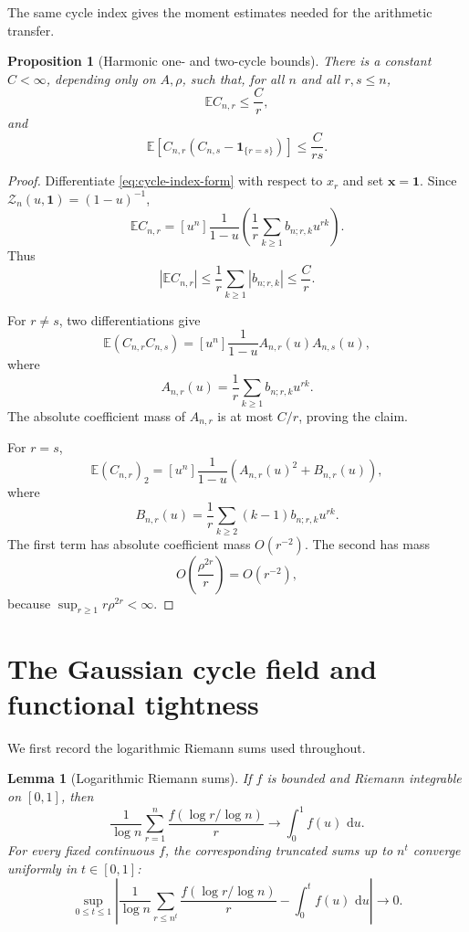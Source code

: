 \documentclass[11pt]{article}
\newtheorem{proposition}[theorem]{Proposition}
\newtheorem{lemma}[theorem]{Lemma}
\theoremstyle{definition}
\theoremstyle{remark}
\newcommand{\Ee}{\mathbb E}
\newcommand{\one}{\mathbf 1}
\newcommand{\dd}{\,\mathrm d}
\newcommand{\cZ}{\mathcal Z}
\begin{document}
The same cycle index gives the moment estimates needed for the arithmetic
transfer.

\begin{proposition}[Harmonic one- and two-cycle bounds]
\label{prop:harmonic-moments}
There is a constant $C<\infty$, depending only on $A,\rho$, such that,
for all $n$ and all $r,s\le n$,
\[
 \Ee C_{n,r}\le\frac{C}{r},
\]
and
\[
 \Ee\!\left[
 C_{n,r}(C_{n,s}-\one_{\{r=s\}})
 \right]
 \le\frac{C}{rs}.
\]
\end{proposition}

\begin{proof}
Differentiate \eqref{eq:cycle-index-form} with respect to $x_r$ and set
$\mathbf x=\mathbf1$.  Since $\cZ_n(u,\mathbf1)=(1-u)^{-1}$,
\[
 \Ee C_{n,r}
 =
 [u^n]\frac1{1-u}
 \left(
 \frac1r\sum_{k\ge1}b_{n;r,k}u^{rk}
 \right).
\]
Thus
\[
 |\Ee C_{n,r}|
 \le\frac1r\sum_{k\ge1}|b_{n;r,k}|
 \le\frac{C}{r}.
\]

For $r\ne s$, two differentiations give
\[
 \Ee(C_{n,r}C_{n,s})
 =
 [u^n]\frac1{1-u}A_{n,r}(u)A_{n,s}(u),
\]
where
\[
 A_{n,r}(u)=\frac1r\sum_{k\ge1}b_{n;r,k}u^{rk}.
\]
The absolute coefficient mass of $A_{n,r}$ is at most $C/r$, proving the
claim.

For $r=s$,
\[
 \Ee(C_{n,r})_2
 =
 [u^n]\frac1{1-u}
 \left(A_{n,r}(u)^2+B_{n,r}(u)\right),
\]
where
\[
 B_{n,r}(u)
 =
 \frac1r\sum_{k\ge2}(k-1)b_{n;r,k}u^{rk}.
\]
The first term has absolute coefficient mass $O(r^{-2})$.  The second has
mass
\[
 O\left(\frac{\rho^{2r}}r\right)=O(r^{-2}),
\]
because $\sup_{r\ge1}r\rho^{2r}<\infty$.
\end{proof}

\section{The Gaussian cycle field and functional tightness}

We first record the logarithmic Riemann sums used throughout.

\begin{lemma}[Logarithmic Riemann sums]\label{lem:riemann}
If $f$ is bounded and Riemann integrable on $[0,1]$, then
\[
 \frac1{\log n}
 \sum_{r=1}^n\frac{f(\log r/\log n)}r
 \longrightarrow
 \int_0^1f(u)\,\dd u.
\]
For every fixed continuous $f$, the corresponding truncated sums up to
$n^t$ converge uniformly in $t\in[0,1]$:
\[
 \sup_{0\le t\le1}
 \left|
 \frac1{\log n}
 \sum_{r\le n^t}\frac{f(\log r/\log n)}r
 -
 \int_0^t f(u)\,\dd u
 \right|
 \longrightarrow0.
\]
\end{lemma}
\end{document}
